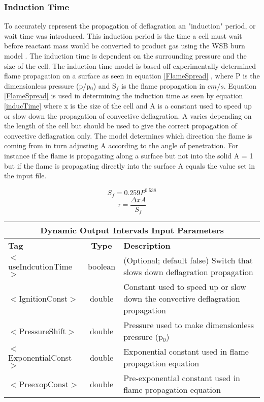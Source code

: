 \newpage
\subsubsection{Induction Time} \label {Sec:Induction Time }
To accurately represent the propagation of deflagration an "induction" period, or wait time was introduced. This induction period is the time a cell must wait before reactant mass would be converted to product gas using the WSB burn model \cite{ref:wardsonbrewster}.   The induction time is dependent on the surrounding pressure and the size of the cell. The induction time model is based off experimentally determined flame propagation on a surface as seen in equation \ref{FlameSpread} \cite{flameProp}, where P is the dimensionless pressure (p/p$_0$) and S$_f$ is the flame propagation in $cm/s$. Equation \ref{FlameSpread} is used in determining the induction time as seen by equation \ref{inducTime} where x is the size of the cell and A is a constant used to speed up or slow down the propagation of convective deflagration. A varies depending on the length of the cell but should be used to give the correct propagation of convective deflagration only. The model determines which direction the flame is coming from in turn adjusting A according to the angle of penetration.
For instance if the flame is propagating along a surface but not into the solid A = 1 but if the flame is propagating directly into the surface A equals the value set in the input file.

\begin{equation}
S_f = 0.259{\displaystyle P^{0.538}}
\label{FlameSpread}
\end{equation}
\begin{equation}
\tau = \frac{\Delta x A}{S_f} 
\label{inducTime}
\end{equation}

\begin{center}
\begin{tabular}{| l | c | p{7cm} |}
\hline
  \multicolumn{3}{|c|}{\textbf{Dynamic Output Intervals Input Parameters}} \\
\hline
\hline
  \textbf{Tag} & \textbf{Type} & \textbf{Description}\\
\hline
  $<$useIndcutionTime$>$ & boolean & (Optional; default false) Switch that slows down deflagration propagation\\
\hline
  $<$IgnitionConst$>$ & double & Constant used to speed up or slow down the convective deflagration propagation\\
\hline
  $<$PressureShift$>$ & double & Pressure used to make dimensionless pressure (p$_0$)\\
\hline
  $<$ExponentialConst$>$ & double & Exponential constant used in flame propagation equation\\
\hline
  $<$PreexopConst$>$ & double & Pre-exponential constant used in flame propagation equation\\
\hline
\end{tabular}
\end{center}



